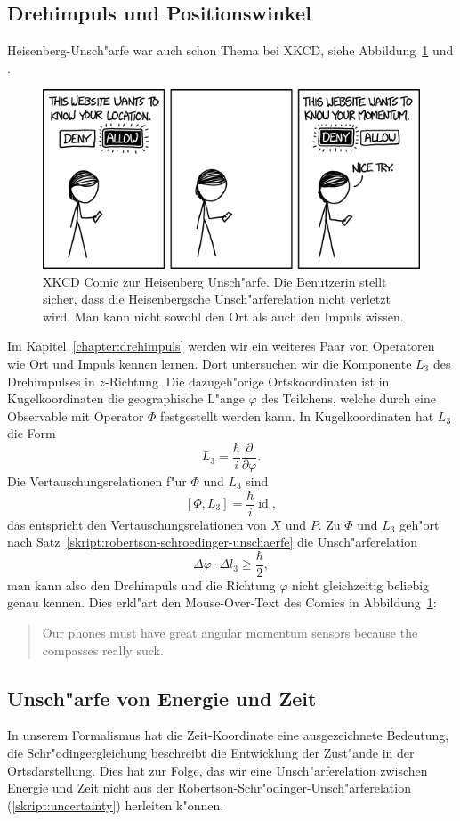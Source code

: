 \subsection{Drehimpuls und Positionswinkel}
Heisenberg-Unsch"arfe war auch schon Thema bei XKCD, siehe
Abbildung~\ref{skript:heisenberg:xkcd} und \cite{skript:xkcd}.
\begin{figure}
\centering
\includegraphics[width=0.8\hsize]{images/xkcd-location-sharing.png}
\caption{XKCD Comic zur Heisenberg Unsch"arfe. Die Benutzerin stellt sicher,
dass die Heisenbergsche Unsch"arferelation nicht verletzt wird. Man kann nicht
sowohl den Ort als auch den Impuls wissen.
\label{skript:heisenberg:xkcd}}
\end{figure}
Im Kapitel~\ref{chapter:drehimpuls} werden wir ein weiteres Paar
von Operatoren wie Ort und Impuls kennen lernen.
Dort untersuchen wir die Komponente $L_3$ des Drehimpulses in $z$-Richtung.
Die dazugeh"orige Ortskoordinaten ist in Kugelkoordinaten die geographische 
L"ange $\varphi$ des Teilchens, welche durch eine Observable mit Operator
$\Phi$ festgestellt werden kann.
In Kugelkoordinaten hat $L_3$ die Form
\[
L_3=\frac{\hbar}{i}\frac{\partial}{\partial\varphi}.
\]
Die Vertauschungsrelationen f"ur $\Phi$ und $L_3$ sind
\[
[\Phi,L_3]=\frac{\hbar}{i}\operatorname{id},
\]
das entspricht den Vertauschungsrelationen von $X$ und $P$.
Zu $\Phi$ und $L_3$ geh"ort nach Satz~\ref{skript:robertson-schroedinger-unschaerfe}
die Unsch"arferelation
\[
\Delta\varphi\cdot\Delta l_3 \ge \frac{\hbar}2,
\]
man kann also den Drehimpuls und die Richtung $\varphi$ nicht gleichzeitig
beliebig genau kennen.
Dies erkl"art den Mouse-Over-Text des Comics in
Abbildung~\ref{skript:heisenberg:xkcd}:
\begin{quote}
Our phones must have great angular momentum sensors because
the compasses really suck.
\end{quote}

\subsection{Unsch"arfe von Energie und Zeit}
In unserem Formalismus hat die Zeit-Koordinate eine ausgezeichnete
Bedeutung, die Schr"odingergleichung beschreibt die Entwicklung
der Zust"ande in der Ortsdarstellung.
Dies hat zur Folge, das wir eine Unsch"arferelation zwischen Energie
und Zeit nicht aus der Robertson-Schr"odinger-Unsch"arferelation
(\ref{skript:uncertainty}) herleiten k"onnen.

